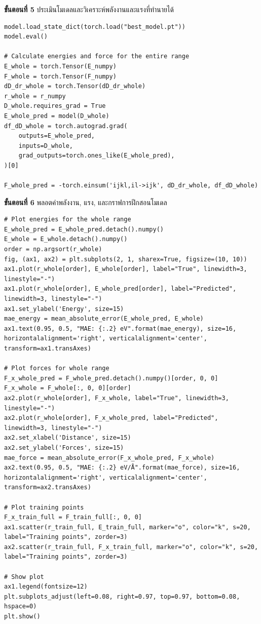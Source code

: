 \vspace{1em}

\noindent \textbf{ขั้นตอนที่ 5} ประเมินโมเดลและวิเคราะห์พลังงานและแรงที่ทำนายได้

\begin{lstlisting}[style=MyPython]
model.load_state_dict(torch.load("best_model.pt"))
model.eval()

# Calculate energies and force for the entire range
E_whole = torch.Tensor(E_numpy)
F_whole = torch.Tensor(F_numpy)
dD_dr_whole = torch.Tensor(dD_dr_whole)
r_whole = r_numpy
D_whole.requires_grad = True
E_whole_pred = model(D_whole)
df_dD_whole = torch.autograd.grad(
    outputs=E_whole_pred,
    inputs=D_whole,
    grad_outputs=torch.ones_like(E_whole_pred),
)[0]

F_whole_pred = -torch.einsum('ijkl,il->ijk', dD_dr_whole, df_dD_whole)
\end{lstlisting}

\vspace{1em}

\noindent \textbf{ขั้นตอนที่ 6} พลอตค่าพลังงาน, แรง, และกราฟการฝึกสอนโมเดล

\begin{lstlisting}[style=MyPython]
# Plot energies for the whole range
E_whole_pred = E_whole_pred.detach().numpy()
E_whole = E_whole.detach().numpy()
order = np.argsort(r_whole)
fig, (ax1, ax2) = plt.subplots(2, 1, sharex=True, figsize=(10, 10))
ax1.plot(r_whole[order], E_whole[order], label="True", linewidth=3, linestyle="-")
ax1.plot(r_whole[order], E_whole_pred[order], label="Predicted", linewidth=3, linestyle="-")
ax1.set_ylabel('Energy', size=15)
mae_energy = mean_absolute_error(E_whole_pred, E_whole)
ax1.text(0.95, 0.5, "MAE: {:.2} eV".format(mae_energy), size=16, horizontalalignment='right', verticalalignment='center', transform=ax1.transAxes)

# Plot forces for whole range
F_x_whole_pred = F_whole_pred.detach().numpy()[order, 0, 0]
F_x_whole = F_whole[:, 0, 0][order]
ax2.plot(r_whole[order], F_x_whole, label="True", linewidth=3, linestyle="-")
ax2.plot(r_whole[order], F_x_whole_pred, label="Predicted", linewidth=3, linestyle="-")
ax2.set_xlabel('Distance', size=15)
ax2.set_ylabel('Forces', size=15)
mae_force = mean_absolute_error(F_x_whole_pred, F_x_whole)
ax2.text(0.95, 0.5, "MAE: {:.2} eV/Å".format(mae_force), size=16, horizontalalignment='right', verticalalignment='center', transform=ax2.transAxes)

# Plot training points
F_x_train_full = F_train_full[:, 0, 0]
ax1.scatter(r_train_full, E_train_full, marker="o", color="k", s=20, label="Training points", zorder=3)
ax2.scatter(r_train_full, F_x_train_full, marker="o", color="k", s=20, label="Training points", zorder=3)

# Show plot
ax1.legend(fontsize=12)
plt.subplots_adjust(left=0.08, right=0.97, top=0.97, bottom=0.08, hspace=0)
plt.show()
\end{lstlisting}

